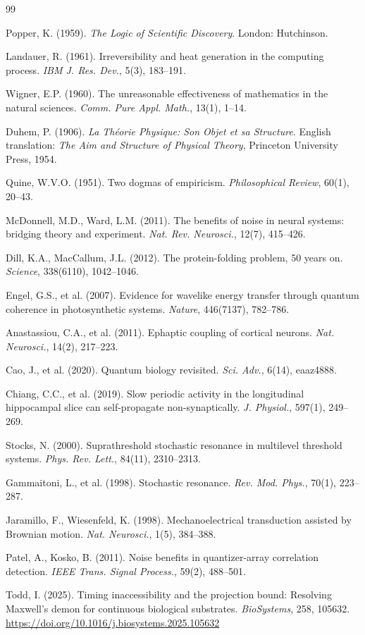 \documentclass[12pt]{article}
\begin{document}
\begin{thebibliography}{99}

Popper, K. (1959). \textit{The Logic of Scientific Discovery}. London: Hutchinson.

Landauer, R. (1961). Irreversibility and heat generation in the computing process. \textit{IBM J. Res. Dev.}, 5(3), 183--191.

Wigner, E.P. (1960). The unreasonable effectiveness of mathematics in the natural sciences. \textit{Comm. Pure Appl. Math.}, 13(1), 1--14.

Duhem, P. (1906). \textit{La Th\'eorie Physique: Son Objet et sa Structure}. English translation: \textit{The Aim and Structure of Physical Theory}, Princeton University Press, 1954.

Quine, W.V.O. (1951). Two dogmas of empiricism. \textit{Philosophical Review}, 60(1), 20--43.

McDonnell, M.D., Ward, L.M. (2011). The benefits of noise in neural systems: bridging theory and experiment. \textit{Nat. Rev. Neurosci.}, 12(7), 415--426.

Dill, K.A., MacCallum, J.L. (2012). The protein-folding problem, 50 years on. \textit{Science}, 338(6110), 1042--1046.

Engel, G.S., et al. (2007). Evidence for wavelike energy transfer through quantum coherence in photosynthetic systems. \textit{Nature}, 446(7137), 782--786.

Anastassiou, C.A., et al. (2011). Ephaptic coupling of cortical neurons. \textit{Nat. Neurosci.}, 14(2), 217--223.

Cao, J., et al. (2020). Quantum biology revisited. \textit{Sci. Adv.}, 6(14), eaaz4888.

Chiang, C.C., et al. (2019). Slow periodic activity in the longitudinal hippocampal slice can self-propagate non-synaptically. \textit{J. Physiol.}, 597(1), 249--269.

Stocks, N. (2000). Suprathreshold stochastic resonance in multilevel threshold systems. \textit{Phys. Rev. Lett.}, 84(11), 2310--2313.

Gammaitoni, L., et al. (1998). Stochastic resonance. \textit{Rev. Mod. Phys.}, 70(1), 223--287.

Jaramillo, F., Wiesenfeld, K. (1998). Mechanoelectrical transduction assisted by Brownian motion. \textit{Nat. Neurosci.}, 1(5), 384--388.

Patel, A., Kosko, B. (2011). Noise benefits in quantizer-array correlation detection. \textit{IEEE Trans. Signal Process.}, 59(2), 488--501.

Todd, I. (2025). Timing inaccessibility and the projection bound: Resolving Maxwell's demon for continuous biological substrates. \textit{BioSystems}, 258, 105632. \url{https://doi.org/10.1016/j.biosystems.2025.105632}

\end{thebibliography}
\end{document}
